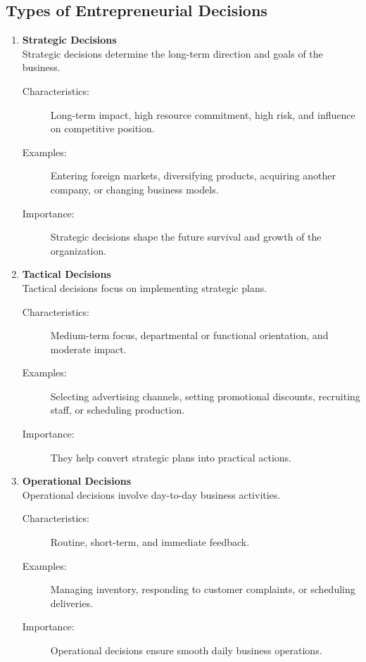 \documentclass[12pt,a4paper]{article}
\begin{document}
\subsection*{Types of Entrepreneurial Decisions}

\begin{enumerate}
    \item \textbf{Strategic Decisions} \\
    Strategic decisions determine the long-term direction and goals of the business.
    \begin{description}
        \item[Characteristics:] Long-term impact, high resource commitment, high risk, and influence on competitive position.
        \item[Examples:] Entering foreign markets, diversifying products, acquiring another company, or changing business models.
        \item[Importance:] Strategic decisions shape the future survival and growth of the organization.
    \end{description}

    \item \textbf{Tactical Decisions} \\
    Tactical decisions focus on implementing strategic plans.
    \begin{description}
        \item[Characteristics:] Medium-term focus, departmental or functional orientation, and moderate impact.
        \item[Examples:] Selecting advertising channels, setting promotional discounts, recruiting staff, or scheduling production.
        \item[Importance:] They help convert strategic plans into practical actions.
    \end{description}

    \item \textbf{Operational Decisions} \\
    Operational decisions involve day-to-day business activities.
    \begin{description}
        \item[Characteristics:] Routine, short-term, and immediate feedback.
        \item[Examples:] Managing inventory, responding to customer complaints, or scheduling deliveries.
        \item[Importance:] Operational decisions ensure smooth daily business operations.
    \end{description}
\end{enumerate}
\end{document}

